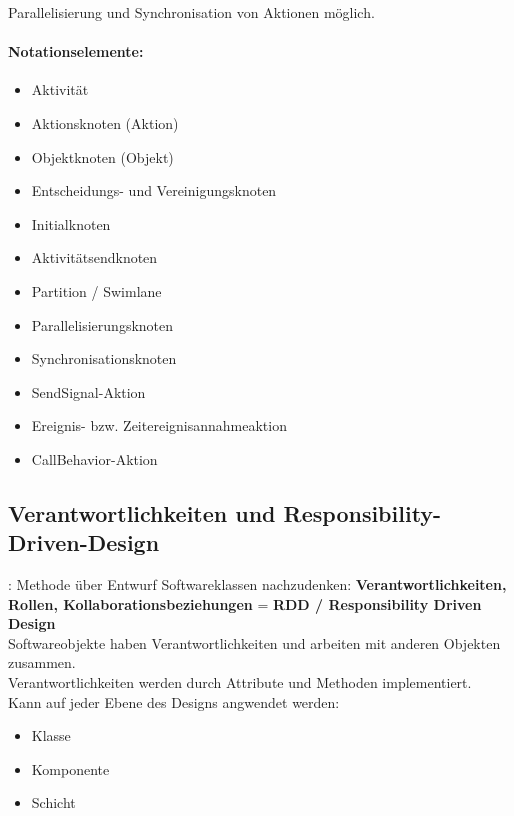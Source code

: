\documentclass[../ZF_SWEN1.tex]{subfiles}
\begin{document}
Parallelisierung und Synchronisation von Aktionen möglich.

\paragraph{Notationselemente:}
\begin{itemize}
	\item Aktivität
	\item Aktionsknoten (Aktion)
	\item Objektknoten (Objekt)
	\item Entscheidungs- und Vereinigungsknoten
	\item Initialknoten
	\item Aktivitätsendknoten
	\item Partition / Swimlane
	\item Parallelisierungsknoten
	\item Synchronisationsknoten
	\item SendSignal-Aktion
	\item Ereignis- bzw. Zeitereignisannahmeaktion
	\item CallBehavior-Aktion
\end{itemize}


\subsection{Verantwortlichkeiten und Responsibility-Driven-Design}:
Methode über Entwurf Softwareklassen nachzudenken:
\textcolor {yelloworange} {\textbf{Verantwortlichkeiten, Rollen, Kollaborationsbeziehungen}} = \textbf{RDD / Responsibility Driven Design}\\

Softwareobjekte haben Verantwortlichkeiten und arbeiten mit anderen Objekten zusammen.\\
Verantwortlichkeiten werden durch Attribute und Methoden implementiert.\\
Kann auf jeder Ebene des Designs angwendet werden:
\begin{itemize}
	\item Klasse
	\item Komponente
	\item Schicht
\end{itemize}
\end{document}
